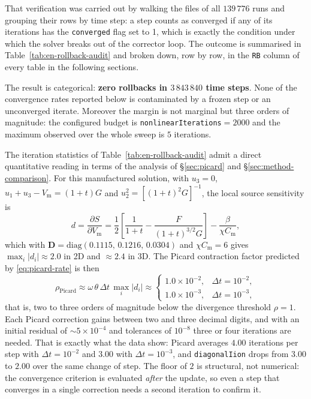 \documentclass[11pt,a4paper]{article}
\newcommand{\code}[1]{\texttt{\small #1}}
\newcommand{\Vm}{V_{\text{m}}}
\newcommand{\Dten}{\mathbf{D}}
\begin{document}
That verification was carried out by walking the
 files of all
$139\,776$ runs and grouping their rows by time step: a step counts as converged
if any of its iterations has the \code{converged} flag set to 1, which is
exactly the condition under which the solver breaks out of the corrector loop.
The outcome is summarised in Table~\ref{tab:en-rollback-audit} and broken down,
row by row, in the \code{RB} column of every table in the following sections.



\FloatBarrier

The result is categorical: \textbf{zero rollbacks in $3\,843\,840$ time steps}.
None of the convergence rates reported below is contaminated by a frozen step or
an unconverged iterate. Moreover the margin is not marginal but three orders of
magnitude: the configured budget is \code{nonlinearIterations}$=2000$ and the
maximum observed over the whole sweep is $5$ iterations.

The iteration statistics of Table~\ref{tab:en-rollback-audit} admit a direct
quantitative reading in terms of the analysis of \S\ref{sec:picard} and
\S\ref{sec:method-comparison}. For this manufactured solution, with $u_3=0$,
$u_1+u_3-\Vm=(1+t)G$ and $u_2^2=[(1+t)^2G]^{-1}$, the local source sensitivity
is
\begin{equation}
  d=\frac{\partial S}{\partial \Vm}
  =
  \frac{1}{2}\left[\frac{1}{1+t}-\frac{F}{(1+t)^{3/2}G}\right]
  -\frac{\beta}{\chi C_{\text{m}}},
  \label{eq:d-analytic}
\end{equation}
which with $\Dten=\mathrm{diag}(0.1115,\,0.1216,\,0.0304)$ and
$\chi C_{\text{m}}=6$ gives $\max_i|d_i|\approx 2.0$ in 2D and $\approx 2.4$ in
3D. The Picard contraction factor predicted by \eqref{eq:picard-rate} is then
\begin{equation}
  \rho_{\text{Picard}}\approx\omega\,\theta\,\Delta t\,\max_i|d_i|
  \approx
  \begin{cases}
    1.0\times10^{-2}, & \Delta t=10^{-2},\\
    1.0\times10^{-3}, & \Delta t=10^{-3},
  \end{cases}
  \label{eq:rho-numeric}
\end{equation}
that is, two to three orders of magnitude below the divergence threshold
$\rho=1$. Each Picard correction gains between two and three decimal digits, and
with an initial residual of $\sim\!5\times10^{-4}$ and tolerances of $10^{-8}$
three or four iterations are needed. That is exactly what the data show: Picard
averages $4.00$ iterations per step with $\Delta t=10^{-2}$ and $3.00$ with
$\Delta t=10^{-3}$, and \code{diagonalIion} drops from $3.00$ to $2.00$ over the
same change of step. The floor of $2$ is structural, not numerical: the
convergence criterion is evaluated \emph{after} the update, so even a step that
converges in a single correction needs a second iteration to confirm it.
\end{document}
